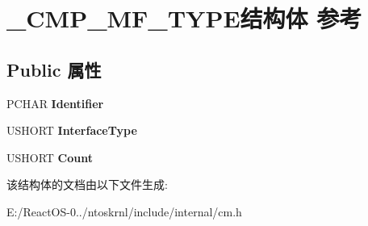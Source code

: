 \hypertarget{struct___c_m_p___m_f___t_y_p_e}{}\section{\+\_\+\+C\+M\+P\+\_\+\+M\+F\+\_\+\+T\+Y\+P\+E结构体 参考}
\label{struct___c_m_p___m_f___t_y_p_e}
\subsection*{Public 属性}
\begin{DoxyCompactItemize}
\item 
\mbox{\label{struct___c_m_p___m_f___t_y_p_e_a49534f65bb562c59f43f2882d727a396}} 
P\+C\+H\+AR {\bfseries Identifier}
\item 
\mbox{\label{struct___c_m_p___m_f___t_y_p_e_af9fe8f860937e57cd887696e000bc1ac}} 
U\+S\+H\+O\+RT {\bfseries Interface\+Type}
\item 
\mbox{\label{struct___c_m_p___m_f___t_y_p_e_a1560c76dc3ad185b6f9e70723ecf3cda}} 
U\+S\+H\+O\+RT {\bfseries Count}
\end{DoxyCompactItemize}


该结构体的文档由以下文件生成\+:\begin{DoxyCompactItemize}
\item 
E\+:/\+React\+O\+S-\/0../ntoskrnl/include/internal/cm.\+h\end{DoxyCompactItemize}
